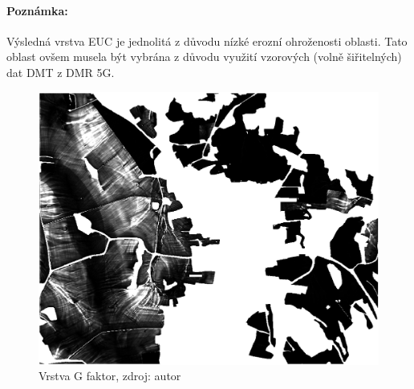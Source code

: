 \paragraph{Poznámka:} Výsledná vrstva EUC je jednolitá z důvodu nízké
erozní ohroženosti oblasti. Tato oblast ovšem musela být vybrána z
důvodu využití vzorových (volně šiřitelných) dat DMT z DMR 5G.
\begin{figure}[H] \centering
		\includegraphics[width=.5\textwidth]{./pictures/lokalni_eroze_layer.png}
		\caption[Vrstva G faktor]{Vrstva G faktor, zdroj:
autor}
		\label{g_sample}
              \end{figure}
              
              

